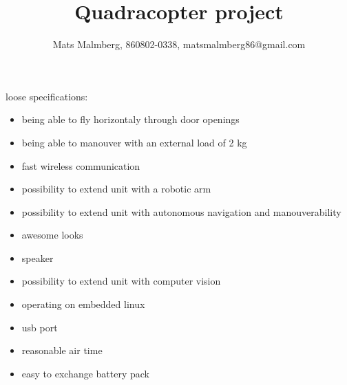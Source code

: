 \documentclass[12pt]{article}
\title{\center Quadracopter project}			%
\author{ Mats Malmberg, 860802-0338, matsmalmberg86@gmail.com}
\begin{document}
\maketitle			%

loose specifications:\\
\begin{itemize}
\item being able to fly horizontaly through door openings
\item being able to manouver with an external load of 2 kg
\item fast wireless communication
\item possibility to extend unit with a robotic arm
\item possibility to extend unit with autonomous navigation and manouverability
\item awesome looks
\item speaker
\item possibility to extend unit with computer vision
\item operating on embedded linux
\item usb port
\item reasonable air time
\item easy to exchange battery pack
\end{itemize}
\end{document}
